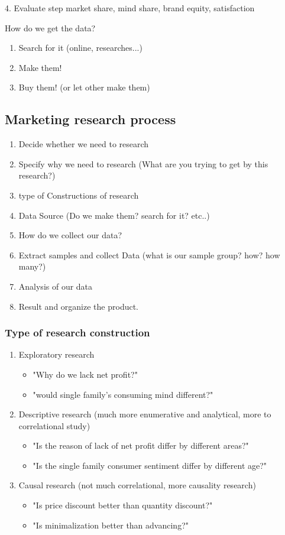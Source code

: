 \documentclass[12pt]{article}
\begin{document}
4. Evaluate step
market share, mind share, brand equity, satisfaction



How do we get the data?
\begin{enumerate}
	\item Search for it (online, researches...)
	\item Make them!
	\item Buy them! (or let other make them)
\end{enumerate}

\subsection{Marketing research process}

\begin{enumerate}
	\item Decide whether we need to research
	\item Specify why we need to research (What are you trying to get by this research?)
	\item type of Constructions of research
	\item Data Source (Do we make them? search for it? etc..)
	\item How do we collect our data?
	\item Extract samples and collect Data (what is our sample group? how? how many?)
	\item Analysis of our data
	\item Result and organize the product.
\end{enumerate}

\subsubsection{Type of research construction}
\begin{enumerate}
	\item Exploratory research
	\begin{itemize}
		\item "Why do we lack net profit?"
		\item "would single family's consuming mind different?"
	\end{itemize}
	\item Descriptive research (much more enumerative and analytical, more to correlational study)
	\begin{itemize}
		\item "Is the reason of lack of net profit differ by different areas?"
		\item "Is the single family consumer sentiment differ by different age?"
	\end{itemize}
	\item Causal research (not much correlational, more causality research)
	\begin{itemize}
		\item "Is price discount better than quantity discount?"
		\item "Is minimalization better than advancing?"
	\end{itemize}

\end{enumerate}
\end{document}
